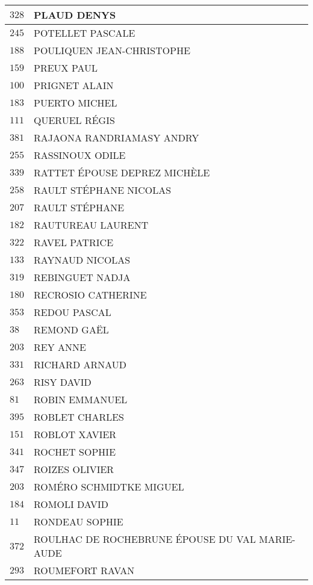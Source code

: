 \begin{xltabular}{\linewidth}{|l|X|}
    \hline
    $328$ & PLAUD DENYS \\
    \hline
    $245$ & POTELLET PASCALE \\
    \hline
    $188$ & POULIQUEN JEAN-CHRISTOPHE \\
    \hline
    $159$ & PREUX PAUL \\
    \hline
    $100$ & PRIGNET ALAIN \\
    \hline
    $183$ & PUERTO MICHEL \\
    \hline
    $111$ & QUERUEL RÉGIS \\
    \hline
    $381$ & RAJAONA RANDRIAMASY ANDRY \\
    \hline
    $255$ & RASSINOUX ODILE \\
    \hline
    $339$ & RATTET ÉPOUSE DEPREZ MICHÈLE \\
    \hline
    $258$ & RAULT STÉPHANE NICOLAS \\
    \hline
    $207$ & RAULT STÉPHANE \\
    \hline
    $182$ & RAUTUREAU LAURENT \\
    \hline
    $322$ & RAVEL PATRICE \\
    \hline
    $133$ & RAYNAUD NICOLAS \\
    \hline
    $319$ & REBINGUET NADJA \\
    \hline
    $180$ & RECROSIO CATHERINE \\
    \hline
    $353$ & REDOU PASCAL \\
    \hline
    $38$ & REMOND GAËL \\
    \hline
    $203$ & REY ANNE \\
    \hline
    $331$ & RICHARD ARNAUD \\
    \hline
    $263$ & RISY DAVID \\
    \hline
    $81$ & ROBIN EMMANUEL \\
    \hline
    $395$ & ROBLET CHARLES \\
    \hline
    $151$ & ROBLOT XAVIER \\
    \hline
    $341$ & ROCHET SOPHIE \\
    \hline
    $347$ & ROIZES OLIVIER \\
    \hline
    $203$ & ROMÉRO SCHMIDTKE MIGUEL \\
    \hline
    $184$ & ROMOLI DAVID \\
    \hline
    $11$ & RONDEAU SOPHIE \\
    \hline
    $372$ & ROULHAC DE ROCHEBRUNE ÉPOUSE DU VAL MARIE-AUDE \\
    \hline
    $293$ & ROUMEFORT RAVAN \\

\end{xltabular}
